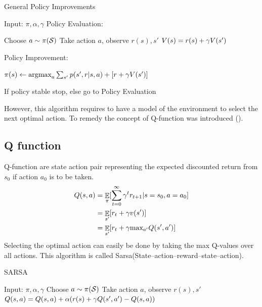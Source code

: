 \begin{algorithm}[H]
\caption{General Policy Improvements}
\begin{algorithmic}[1]
    \STATE Input: $\pi,\alpha,\gamma$
    \STATE Policy Evaluation:
    \begin{ALC@g}
            \STATE Choose $a \sim \pi(\mathcal{S})$
            \STATE Take action $a$, observe $r(s),s'$
            \STATE $V(s) =  r(s) + \gamma V(s') $
        \ENDFOR
    \end{ALC@g}
    \STATE Policy Improvement:
    \begin{ALC@g}
            \STATE $\pi(s) \leftarrow \text{argmax}_a \sum_{s'} p(s',r|s,a) + [r+\gamma V(s')]$
        \ENDFOR
    \end{ALC@g}
    \STATE If policy stable stop, else go to Policy Evaluation
\end{algorithmic}
\label{alg:GPI}
\end{algorithm}

However, this algorithm requires to have a model of the environment to select the next optimal action. To remedy the concept of Q-function was introduced (\cite{watkins1992q}).

\subsection{Q function}
Q-function are state action pair representing the expected discounted return from $s_0$ if action $a_0$ is to be taken.
\begin{equation}
\begin{split}
    Q(s,a) &= \mathop{\mathbb{E}}_{\pi}[\sum_{t=0}^{\infty} \gamma^t r_{t+1} | s = s_0,a = a_0] \\ 
    &= \mathop{\mathbb{E}}_{s'}[r_t + \gamma v(s')]\\
    &= \mathop{\mathbb{E}}_{s'}[r_t + \gamma \text{max}_{a'} Q(s',a')]
\end{split}
\end{equation}
Selecting the optimal action can easily be done by taking the max Q-values over all actions. This algorithm is called Sarsa(State–action–reward–state–action).\\
\begin{algorithm}[H]
\caption{SARSA}
\begin{algorithmic}[1]
    \STATE Input: $\pi,\alpha,\gamma$
        \STATE Choose $a \sim \pi(\mathcal{S})$
        \STATE Take action $a$, observe $r(s),s'$
        \STATE $Q(s,a) = Q(s,a) + \alpha(  r(s) + \gamma Q(s',a') - Q(s,a)) $
    \ENDFOR
\end{algorithmic}
\label{alg:SARSA}
\end{algorithm}


